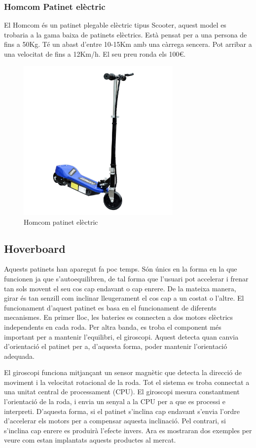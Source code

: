 \subsubsection{Homcom Patinet elèctric} 
El Homcom és un patinet plegable elèctric tipus Scooter, aquest model es trobaria a la gama baixa de patinets elèctrics. Està pensat per a una persona de fins a 50Kg. Té un abast d'entre 10-15Km amb una càrrega sencera. Pot arribar a una velocitat de fins a 12Km/h. El seu preu ronda els 100€.
\begin{figure}[H]
		\centering
    	\includegraphics[width=8cm, height=8cm]{Marcteoric/Homcompatinetelectric.jpg}
     	\caption{Homcom patinet elèctric}
\end{figure}

\subsection{Hoverboard}
Aquests patinets han aparegut fa poc temps. Són únics en la forma en la que funcionen ja que s'autoequilibren, de tal forma que l'usuari pot accelerar i frenar tan sols movent el seu cos cap endavant o cap enrere. De la mateixa manera, girar és tan senzill com inclinar lleugerament el cos cap a un costat o l'altre. El funcionament d'aquest patinet es basa en el funcionament de diferents mecanismes. En primer lloc, les bateries es connecten a dos motors elèctrics independents en cada roda. Per altra banda, es troba el component més important per a mantenir l'equilibri, el giroscopi. Aquest detecta quan canvia d'orientació el patinet per a, d'aquesta forma, poder mantenir l'orientació adequada. 

El giroscopi funciona mitjançant un sensor magnètic que detecta la direcció de moviment i la velocitat rotacional de la roda. 
Tot el sistema es troba connectat a una unitat central de processament (CPU). El giroscopi mesura constantment l'orientació de la roda, i envia un senyal a la CPU per a que es processi e interpreti. D'aquesta forma, si el patinet s'inclina cap endavant s'envia l'ordre d'accelerar els motors per a compensar aquesta inclinació. Pel contrari, si s'inclina cap enrere es produirà l'efecte invers. Ara es mostraran dos exemples per veure com estan implantats aquests productes al mercat. \newline \bigskip

